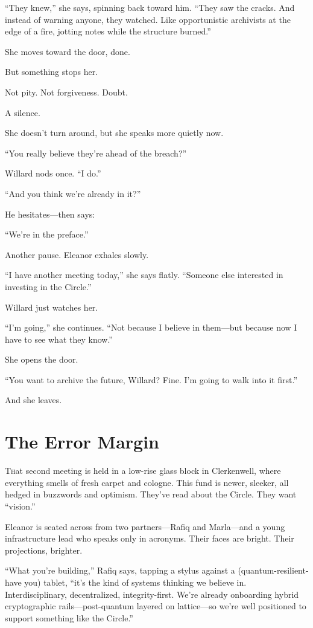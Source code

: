 “They knew,” she says, spinning back toward him. “They saw the cracks. And instead of warning anyone, they watched. Like opportunistic archivists at the edge of a fire, jotting notes while the structure burned.”

She moves toward the door, done.

But something stops her.

Not pity. Not forgiveness.
Doubt.

A silence.

She doesn’t turn around, but she speaks more quietly now.

“You really believe they’re ahead of the breach?”

Willard nods once. “I do.”

“And you think we’re already in it?”

He hesitates—then says:

“We’re in the preface.”

Another pause. Eleanor exhales slowly.

“I have another meeting today,” she says flatly. “Someone else interested in investing in the Circle.”

Willard just watches her.

“I’m going,” she continues. “Not because I believe in them—but because now I have to see what they know.”

She opens the door.

“You want to archive the future, Willard? Fine. I’m going to walk into it first.”

And she leaves.

\section*{The Error Margin}
\lettrine{T}hat second meeting is held in a low-rise glass block in Clerkenwell, where everything smells of fresh carpet and cologne. This fund is newer, sleeker, all hedged in buzzwords and optimism. They’ve read about the Circle. They want “vision.”

Eleanor is seated across from two partners—Rafiq and Marla—and a young infrastructure lead who speaks only in acronyms. Their faces are bright. Their projections, brighter.

“What you’re building,” Rafiq says, tapping a stylus against a (quantum-resilient- have you) tablet, “it’s the kind of systems thinking we believe in. Interdisciplinary, decentralized, integrity-first. We’re already onboarding hybrid cryptographic rails—post-quantum layered on lattice—so we’re well positioned to support something like the Circle.”

